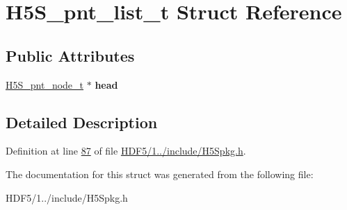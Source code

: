 \hypertarget{struct_h5_s__pnt__list__t}{}\section{H5\+S\+\_\+pnt\+\_\+list\+\_\+t Struct Reference}
\label{struct_h5_s__pnt__list__t}
\subsection*{Public Attributes}
\begin{DoxyCompactItemize}
\item 
\mbox{\label{struct_h5_s__pnt__list__t_a879020f77bd91785608956fc9ba3fee4}} 
\hyperlink{struct_h5_s__pnt__node__t}{H5\+S\+\_\+pnt\+\_\+node\+\_\+t} $\ast$ {\bfseries head}
\end{DoxyCompactItemize}


\subsection{Detailed Description}


Definition at line \hyperlink{_h_d_f5_21_810_81_2include_2_h5_spkg_8h_source_l00087}{87} of file \hyperlink{_h_d_f5_21_810_81_2include_2_h5_spkg_8h_source}{H\+D\+F5/1../include/\+H5\+Spkg.\+h}.



The documentation for this struct was generated from the following file\+:\begin{DoxyCompactItemize}
\item 
H\+D\+F5/1../include/\+H5\+Spkg.\+h\end{DoxyCompactItemize}
